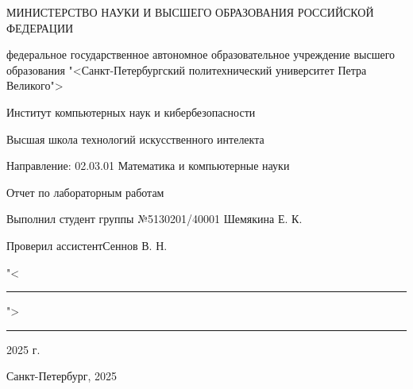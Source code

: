 \documentclass[a4paper]{article}
\begin{document}
\begin{center}
\linespread{1.3}
\MakeUppercase{министерство науки и высшего образования российской федерации}

\small
федеральное государственное автономное образовательное учреждение высшего образования "<Санкт-Петербургский политехнический университет Петра Великого">

\vspace{0.3cm}Институт компьютерных наук и кибербезопасности

\vspace{0.3cm}Высшая школа технологий искусственного интелекта

\vspace{0.3cm}Направление: 02.03.01 Математика и компьютерные науки

\vspace{2cm}\normalsize
Отчет по лабораторным работам


\vspace{6cm}\footnotesize
Выполнил студент группы №5130201/40001 \hfill Шемякина Е. К.

\vspace{1cm}
Проверил ассистент\hfill Сеннов В. Н.

\vspace{1cm}
\begin{flushright}
"<\rule{1cm}{0.01cm}"> \rule{3cm}{0.01cm} 2025 г.
\end{flushright}

\vspace{2cm}Санкт-Петербург, 2025
\end{center}
\end{document}
